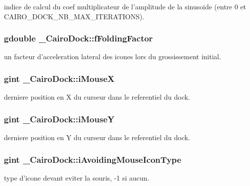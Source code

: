 indice de calcul du coef multiplicateur de l'amplitude de la sinusoide (entre 0 et CAIRO\_\-DOCK\_\-NB\_\-MAX\_\-ITERATIONS). 

\subsubsection{\setlength{\rightskip}{0pt plus 5cm}gdouble {\bf \_\-CairoDock::fFoldingFactor}}\label{struct__CairoDock_baa79bb3acc6fcf84a01d1f70fe1b829}


un facteur d'acceleration lateral des icones lors du grossissement initial. 

\subsubsection{\setlength{\rightskip}{0pt plus 5cm}gint {\bf \_\-CairoDock::iMouseX}}\label{struct__CairoDock_cdb944e2110e7dc7df9e895663980a73}


derniere position en X du curseur dans le referentiel du dock. 

\subsubsection{\setlength{\rightskip}{0pt plus 5cm}gint {\bf \_\-CairoDock::iMouseY}}\label{struct__CairoDock_a7ce6faa5f3cb3d1ebf8a9954dd1a145}


derniere position en Y du curseur dans le referentiel du dock. 

\subsubsection{\setlength{\rightskip}{0pt plus 5cm}gint {\bf \_\-CairoDock::iAvoidingMouseIconType}}\label{struct__CairoDock_5438b1a8cd1df4d6f3eaaf50fcd9463f}


type d'icone devant eviter la souris, -1 si aucun. 

